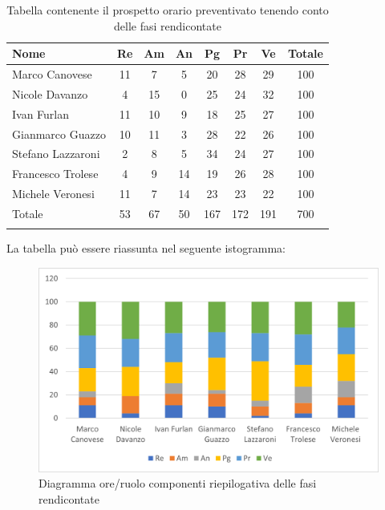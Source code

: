 \begin{longtable}{|l|c|c|c|c|c|c|c|}
	\hline
	\rowcolor{lighter-grayer}
	\textbf{Nome}     & \textbf{Re} & \textbf{Am} & \textbf{An} & \textbf{Pg} & \textbf{Pr} & \textbf{Ve} & \textbf{Totale} \\
	\hline
	\endfirsthead

	\hline
	Marco Canovese    & 11          & 7           & 5           & 20          & 28          & 29          & 100             \\
	\hline
	\hline
	Nicole Davanzo    & 4           & 15          & 0           & 25          & 24          & 32          & 100             \\
	\hline
	\hline
	Ivan Furlan       & 11          & 10          & 9           & 18          & 25          & 27          & 100             \\
	\hline
	\hline
	Gianmarco Guazzo  & 10          & 11          & 3           & 28          & 22          & 26          & 100             \\
	\hline
	\hline
	Stefano Lazzaroni & 2           & 8           & 5           & 34          & 24          & 27          & 100             \\
	\hline
	\hline
	Francesco Trolese & 4           & 9           & 14          & 19          & 26          & 28          & 100             \\
	\hline
	\hline
	Michele Veronesi  & 11          & 7           & 14          & 23          & 23          & 22          & 100             \\
	\hline
	\hline
	Totale            & 53          & 67          & 50          & 167         & 172         & 191         & 700             \\
	\hline
	\rowcolor{white}
	\caption{Tabella contenente il prospetto orario preventivato tenendo conto delle fasi rendicontate}
\end{longtable}


La tabella può essere riassunta nel seguente istogramma:

\begin{figure}[H]
	\centering
	\includegraphics[width=0.8\linewidth]{res/images/preventivo/totrend1.png}
	\caption{Diagramma ore/ruolo componenti riepilogativa delle fasi rendicontate}
	\label{fig:diagramma suddivisione ruoli riepilogativa delle fasi rendicontate}
\end{figure}

